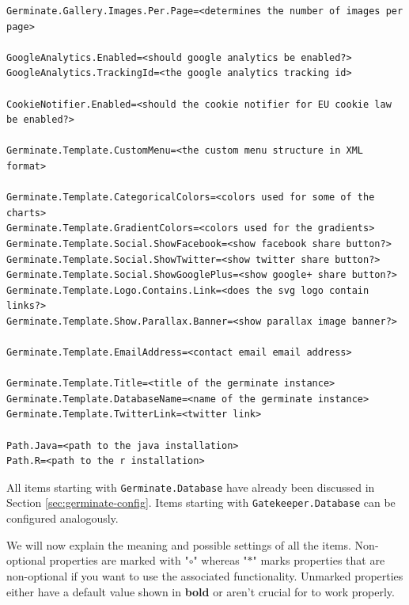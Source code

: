 \begin{lstlisting}[style=Properties]
Germinate.Gallery.Images.Per.Page=<determines the number of images per page>

GoogleAnalytics.Enabled=<should google analytics be enabled?>
GoogleAnalytics.TrackingId=<the google analytics tracking id>

CookieNotifier.Enabled=<should the cookie notifier for EU cookie law be enabled?>

Germinate.Template.CustomMenu=<the custom menu structure in XML format>

Germinate.Template.CategoricalColors=<colors used for some of the charts>
Germinate.Template.GradientColors=<colors used for the gradients>
Germinate.Template.Social.ShowFacebook=<show facebook share button?>
Germinate.Template.Social.ShowTwitter=<show twitter share button?>
Germinate.Template.Social.ShowGooglePlus=<show google+ share button?>
Germinate.Template.Logo.Contains.Link=<does the svg logo contain links?>
Germinate.Template.Show.Parallax.Banner=<show parallax image banner?>

Germinate.Template.EmailAddress=<contact email email address>

Germinate.Template.Title=<title of the germinate instance>
Germinate.Template.DatabaseName=<name of the germinate instance>
Germinate.Template.TwitterLink=<twitter link>

Path.Java=<path to the java installation>
Path.R=<path to the r installation>
\end{lstlisting}
\noindent
All items starting with \texttt{Germinate.Database} have already been discussed in Section \ref{sec:germinate-config}. Items starting with \texttt{Gatekeeper.Database} can be configured analogously.

We will now explain the meaning and possible settings of all the items. Non-optional properties are marked with "$\circ$" whereas "$*$" marks properties that are non-optional if you want to use the associated functionality. Unmarked properties either have a default value shown in \textbf{bold} or aren't crucial for {\germinate} to work properly.

